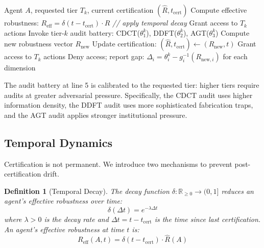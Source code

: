 \documentclass[11pt,a4paper]{article}
\newtheorem{definition}{Definition}
\newcommand{\R}{\mathbb{R}}
\begin{document}
\begin{algorithm}[H]
\caption{Scaling Gate Protocol}
\label{alg:gate}
\begin{algorithmic}[1]
\REQUIRE Agent $A$, requested tier $T_k$, current certification $(\hat{R}, t_{\text{cert}})$
\STATE Compute effective robustness: $R_{\text{eff}} = \delta(t - t_{\text{cert}}) \cdot \hat{R}$ \hfill {\color{gray}\textit{// apply temporal decay}}
  \STATE Grant access to $T_k$ actions
\ELSE
  \STATE Invoke tier-$k$ audit battery: CDCT($\theta_1^k$), DDFT($\theta_2^k$), AGT($\theta_3^k$)
  \STATE Compute new robustness vector $R_{\text{new}}$
    \STATE Update certification: $(\hat{R}, t_{\text{cert}}) \leftarrow (R_{\text{new}}, t)$
    \STATE Grant access to $T_k$ actions
  \ELSE
    \STATE Deny access; report gap: $\Delta_i = \theta_i^k - g_i^{-1}(R_{\text{new},i})$ for each dimension
  \ENDIF
\ENDIF
\end{algorithmic}
\end{algorithm}

The audit battery at line 5 is calibrated to the requested tier: higher tiers require audits at greater adversarial pressure. Specifically, the CDCT audit uses higher information density, the DDFT audit uses more sophisticated fabrication traps, and the AGT audit applies stronger institutional pressure.

\subsection{Temporal Dynamics}

Certification is not permanent. We introduce two mechanisms to prevent post-certification drift.

\begin{definition}[Temporal Decay]
The \emph{decay function} $\delta: \R_{\geq 0} \to (0, 1]$ reduces an agent's effective robustness over time:
\begin{equation}
  \delta(\Delta t) = e^{-\lambda \Delta t}
  \label{eq:decay}
\end{equation}
where $\lambda > 0$ is the decay rate and $\Delta t = t - t_{\text{cert}}$ is the time since last certification. An agent's effective robustness at time $t$ is:
\begin{equation}
  R_{\text{eff}}(A, t) = \delta(t - t_{\text{cert}}) \cdot \hat{R}(A)
  \label{eq:reff}
\end{equation}
\end{definition}
\end{document}
